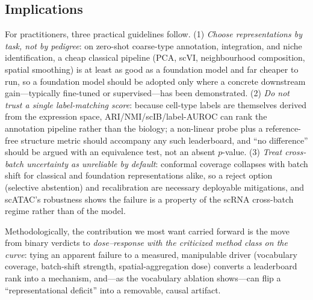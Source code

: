 \documentclass[11pt]{article}
\begin{document}
\subsection*{Implications}
For practitioners, three practical guidelines follow. (1) \emph{Choose representations by task, not by pedigree}: on zero-shot coarse-type annotation, integration, and niche identification, a cheap classical pipeline (PCA, scVI, neighbourhood composition, spatial smoothing) is at least as good as a foundation model and far cheaper to run, so a foundation model should be adopted only where a concrete downstream gain---typically fine-tuned or supervised---has been demonstrated. (2) \emph{Do not trust a single label-matching score}: because cell-type labels are themselves derived from the expression space, ARI/NMI/scIB/label-AUROC can rank the annotation pipeline rather than the biology; a non-linear probe plus a reference-free structure metric should accompany any such leaderboard, and ``no difference'' should be argued with an equivalence test, not an absent $p$-value. (3) \emph{Treat cross-batch uncertainty as unreliable by default}: conformal coverage collapses with batch shift for classical and foundation representations alike, so a reject option (selective abstention) and recalibration are necessary deployable mitigations, and scATAC's robustness shows the failure is a property of the scRNA cross-batch regime rather than of the model.

Methodologically, the contribution we most want carried forward is the move from binary verdicts to \emph{dose--response with the criticized method class on the curve}: tying an apparent failure to a measured, manipulable driver (vocabulary coverage, batch-shift strength, spatial-aggregation dose) converts a leaderboard rank into a mechanism, and---as the vocabulary ablation shows---can flip a ``representational deficit'' into a removable, causal artifact.
\end{document}

